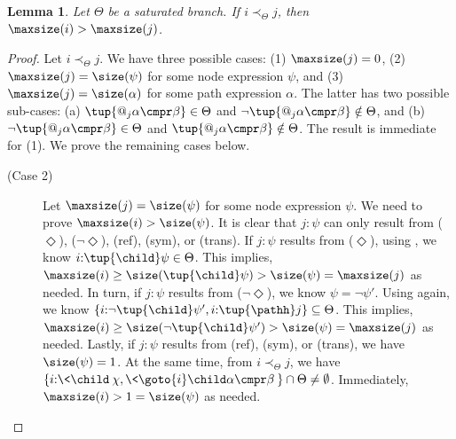 \documentclass[10pt,a4paper]{amsart}
\newtheorem{lem}[thm]{Lemma}
\theoremstyle{definition}
\theoremstyle{remark}
\begin{document}
\begin{lem} \label{lemma:decreasing:length}
  Let $\Theta$ be a saturated branch. If $i \prec_\Theta j$, then $\maxsize(i) > \maxsize(j)$.
\end{lem}
\begin{proof}
  Let $i \prec_\Theta j$.
  We have three possible cases:
    (1) $\maxsize(j) = 0$,
    (2) $\maxsize(j) = \size(\psi)$ for some node expression $\psi$, and
    (3) $\maxsize(j) = \size(\alpha)$ for some path expression $\alpha$.
  The latter has two possible sub-cases:
    (a) $\tup{@_j\alpha \cmpr \beta} \in \Theta$ and $\lnot\tup{@_j\alpha \cmpr \beta} \notin \Theta$, and
    (b) $\lnot\tup{@_j\alpha \cmpr \beta} \in \Theta$ and $\tup{@_j\alpha \cmpr \beta} \notin \Theta$.
  The result is immediate for (1). 
  We prove the remaining cases below.
  
  \begin{description}
    \item[(Case 2)]
      Let $\maxsize(j) = \size(\psi)$ for some node expression $\psi$.
      We need to prove $\maxsize(i) > \size(\psi)$.
      It is clear that $j{:}\psi$ can only result from ($\Diamond$), ($\lnot\Diamond$), (ref), (sym), or (trans).
        If $j{:}\psi$ results from ($\Diamond$), using , we know $i{:}\tup{\child}\psi \in \Theta$.
        This implies, $\maxsize(i) \geq \size(\tup{\child} \psi) > \size (\psi) = \maxsize(j)$ as needed.
        In turn, if $j{:}\psi$ results from ($\lnot\Diamond$), we know $\psi = \lnot\psi'$.
        Using  again, we know $\{i{:}\lnot\tup{\child}\psi', i{:}\tup{\pathh}j\} \subseteq \Theta$.
        This implies, $\maxsize(i) \geq \size(\lnot\tup{\child} \psi') > \size (\psi) = \maxsize(j)$ as needed.
        Lastly, if $j{:}\psi$ results from (ref), (sym), or (trans), we have ${\size(\psi)=1}$. 
        At the same time, from $i \prec_{\Theta}j$, we have $\{i{:}\<\child\>\chi, \<\goto{i}\child\alpha \cmpr \beta\>\} \cap \Theta \neq \emptyset$.
        Immediately, $\maxsize(i) > 1 = \size(\psi)$ as needed.


\end{description}
\end{proof}
\end{document}
